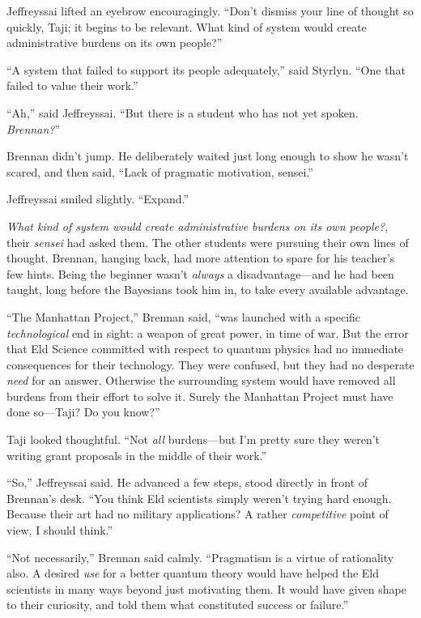 {
 Jeffreyssai lifted an eyebrow encouragingly.
``Don't dismiss your line of thought
so quickly, Taji; it begins to be relevant. What kind of system would
create administrative burdens on its own people?''}

{
 ``A system that failed to support its people
adequately,'' said Styrlyn. ``One
that failed to value their work.''}

{
 ``Ah,'' said Jeffreyssai.
``But there is a student who has not yet spoken.
\textit{Brennan?}''}

{
 Brennan didn't jump. He deliberately waited just
long enough to show he wasn't scared, and then said,
``Lack of pragmatic motivation,
sensei.''}

{
 Jeffreyssai smiled slightly.
``Expand.''}

{
 \textit{What kind of system would create administrative burdens on
its own people?}, their \textit{sensei} had asked them. The other
students were pursuing their own lines of thought. Brennan, hanging
back, had more attention to spare for his teacher's few
hints. Being the beginner wasn't \textit{always} a
disadvantage---and he had been taught, long before the Bayesians took
him in, to take every available advantage.}

{
 ``The Manhattan Project,''
Brennan said, ``was launched with a specific
\textit{technological} end in sight: a weapon of great power, in time
of war. But the error that Eld Science committed with respect to
quantum physics had no immediate consequences for their technology.
They were confused, but they had no desperate \textit{need} for an
answer. Otherwise the surrounding system would have removed all burdens
from their effort to solve it. Surely the Manhattan Project must have
done so---Taji? Do you know?''}

{
 Taji looked thoughtful. ``Not \textit{all}
burdens---but I'm pretty sure they
weren't writing grant proposals in the middle of their
work.''}

{
 ``So,'' Jeffreyssai said. He
advanced a few steps, stood directly in front of
Brennan's desk. ``You think Eld
scientists simply weren't trying hard enough. Because
their art had no military applications? A rather \textit{competitive}
point of view, I should think.''}

{
 ``Not necessarily,'' Brennan
said calmly. ``Pragmatism is a virtue of rationality
also. A desired \textit{use} for a better quantum theory would have
helped the Eld scientists in many ways beyond just motivating them. It
would have given shape to their curiosity, and told them what
constituted success or failure.''}

